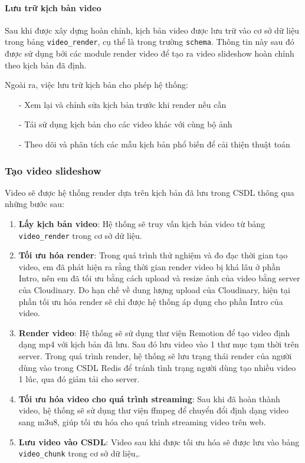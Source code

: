 \paragraph{Lưu trữ kịch bản video}
Sau khi được xây dựng hoàn chỉnh, kịch bản video được lưu trữ vào cơ sở dữ liệu trong bảng \texttt{video\_render}, cụ thể là trong trường \texttt{schema}. Thông tin này sau đó được sử dụng bởi các module render video để tạo ra video slideshow hoàn chỉnh theo kịch bản đã định.

Ngoài ra, việc lưu trữ kịch bản cho phép hệ thống:
\begin{itemize}
    \item[-] Xem lại và chỉnh sửa kịch bản trước khi render nếu cần
    \item[-] Tái sử dụng kịch bản cho các video khác với cùng bộ ảnh
    \item[-] Theo dõi và phân tích các mẫu kịch bản phổ biến để cải thiện thuật toán
\end{itemize}

\subsubsection{Tạo video slideshow}
Video sẽ được hệ thống render dựa trên kịch bản đã lưu trong CSDL thông qua những bước sau:

\begin{enumerate}
    \item \textbf{Lấy kịch bản video}: Hệ thống sẽ truy vấn kịch bản video từ bảng \texttt{video\_render} trong cơ sở dữ liệu.
    \item \textbf{Tối ưu hóa render}: Trong quá trình thử nghiệm và đo đạc thời gian tạo video, em đã phát hiện ra rằng thời gian render video bị khá lâu ở phần Intro, nên em đã tối ưu bằng cách upload và resize ảnh của video bằng server của Cloudinary. Do hạn chế về dung lượng upload của Cloudinary, hiện tại phần tối ưu hóa render sẽ chỉ được hệ thống áp dụng cho phần Intro của video.
    \item \textbf{Render video}: Hệ thống sẽ sử dụng thư viện Remotion để tạo video định dạng mp4 với kịch bản đã lưu. Sau đó lưu video vào 1 thư mục tạm thời trên server. Trong quá trình render, hệ thống sẽ lưu trạng thái render của người dùng vào trong CSDL Redis để tránh tình trạng người dùng tạo nhiều video 1 lúc, qua đó giảm tải cho server.
    \item \textbf{Tối ưu hóa video cho quá trình streaming}: Sau khi đã hoàn thành video, hệ thống sẽ sử dụng thư viện ffmpeg để chuyển đổi định dạng video sang m3u8, giúp tối ưu hóa cho quá trình streaming video trên web. 
    \item \textbf{Lưu video vào CSDL}: Video sau khi được tối ưu hóa sẽ được lưu vào bảng \texttt{video\_chunk} trong cơ sở dữ liệu,.
\end{enumerate}

